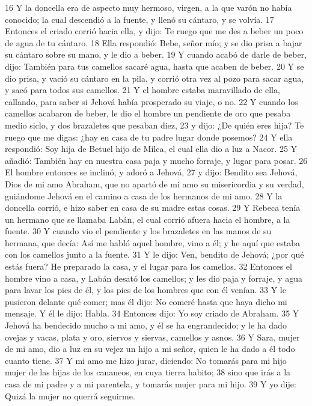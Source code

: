 16 Y la doncella era de aspecto muy hermoso, virgen, a la que varón no había conocido; la cual descendió a la fuente, y llenó su cántaro, y se volvía.
17 Entonces el criado corrió hacia ella, y dijo: Te ruego que me des a beber un poco de agua de tu cántaro.
18 Ella respondió: Bebe, señor mío; y se dio prisa a bajar su cántaro sobre su mano, y le dio a beber.
19 Y cuando acabó de darle de beber, dijo: También para tus camellos sacaré agua, hasta que acaben de beber.
20 Y se dio prisa, y vació su cántaro en la pila, y corrió otra vez al pozo para sacar agua, y sacó para todos sus camellos.
21 Y el hombre estaba maravillado de ella, callando, para saber si Jehová había prosperado su viaje, o no.
22 Y cuando los camellos acabaron de beber, le dio el hombre un pendiente de oro que pesaba medio siclo, y dos brazaletes que pesaban diez,
23 y dijo: ¿De quién eres hija? Te ruego que me digas: ¿hay en casa de tu padre lugar donde posemos?
24 Y ella respondió: Soy hija de Betuel hijo de Milca, el cual ella dio a luz a Nacor.
25 Y añadió: También hay en nuestra casa paja y mucho forraje, y lugar para posar.
26 El hombre entonces se inclinó, y adoró a Jehová,
27 y dijo: Bendito sea Jehová, Dios de mi amo Abraham, que no apartó de mi amo su misericordia y su verdad, guiándome Jehová en el camino a casa de los hermanos de mi amo.
28 Y la doncella corrió, e hizo saber en casa de su madre estas cosas.
29 Y Rebeca tenía un hermano que se llamaba Labán, el cual corrió afuera hacia el hombre, a la fuente.
30 Y cuando vio el pendiente y los brazaletes en las manos de su hermana, que decía: Así me habló aquel hombre, vino a él; y he aquí que estaba con los camellos junto a la fuente.
31 Y le dijo: Ven, bendito de Jehová; ¿por qué estás fuera? He preparado la casa, y el lugar para los camellos.
32 Entonces el hombre vino a casa, y Labán desató los camellos; y les dio paja y forraje, y agua para lavar los pies de él, y los pies de los hombres que con él venían.
33 Y le pusieron delante qué comer; mas él dijo: No comeré hasta que haya dicho mi mensaje. Y él le dijo: Habla.
34 Entonces dijo: Yo soy criado de Abraham.
35 Y Jehová ha bendecido mucho a mi amo, y él se ha engrandecido; y le ha dado ovejas y vacas, plata y oro, siervos y siervas, camellos y asnos.
36 Y Sara, mujer de mi amo, dio a luz en su vejez un hijo a mi señor, quien le ha dado a él todo cuanto tiene.
37 Y mi amo me hizo jurar, diciendo: No tomarás para mi hijo mujer de las hijas de los cananeos, en cuya tierra habito;
38 sino que irás a la casa de mi padre y a mi parentela, y tomarás mujer para mi hijo.
39 Y yo dije: Quizá la mujer no querrá seguirme.

